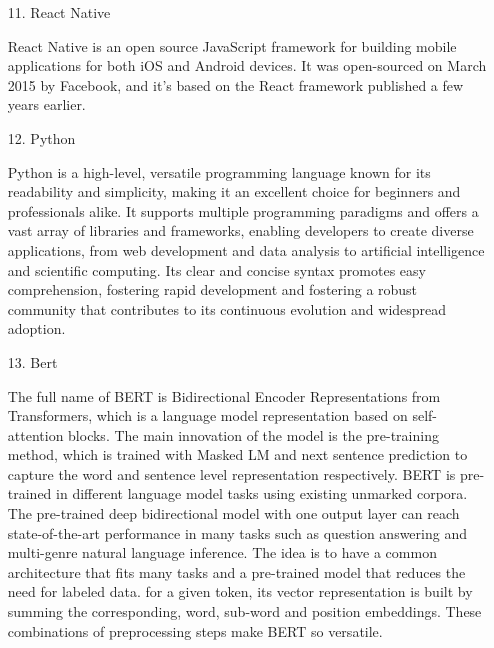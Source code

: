 \documentclass[conference]{IEEEtran}
\begin{document}
\begin{enumerate}
\begin{enumerate}
        \item[11.]React Native \cite{waren2016cross}
        \item[]React Native is an open source JavaScript framework for building mobile applications for both iOS and Android devices. It was open-sourced on March 2015 by Facebook, and it's based on the React framework published a few years earlier. \\
        
        \item[12.]Python
        \item[]Python is a high-level, versatile programming language known for its readability and simplicity, making it an excellent choice for beginners and professionals alike. It supports multiple programming paradigms and offers a vast array of libraries and frameworks, enabling developers to create diverse applications, from web development and data analysis to artificial intelligence and scientific computing. Its clear and concise syntax promotes easy comprehension, fostering rapid development and fostering a robust community that contributes to its continuous evolution and widespread adoption.\\

        \item[13.]Bert \cite{affi2021blc}
        \item[]The full name of BERT is Bidirectional Encoder Representations from Transformers, which is a language model representation based on self-attention blocks. The main innovation of the model is the pre-training method, which is trained with Masked LM and next sentence prediction to capture the word and sentence level representation respectively. BERT is pre-trained in different language model tasks using existing unmarked corpora. The pre-trained deep bidirectional model with one output layer can reach state-of-the-art performance in many tasks such as question answering and multi-genre natural language inference. The idea is to have a common architecture that fits many tasks and a pre-trained model that reduces the need for labeled data. for a given token, its vector representation is built by summing the corresponding, word, sub-word and position embeddings. These combinations of preprocessing steps make BERT so versatile. \\


\end{enumerate}
\end{enumerate}
\end{document}
